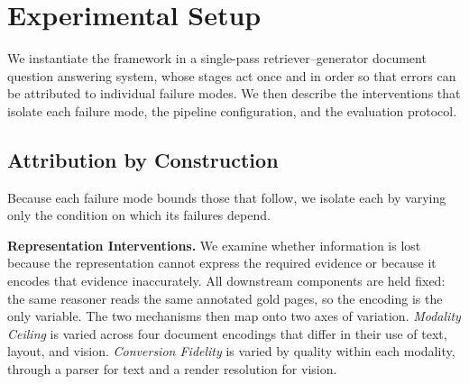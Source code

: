 \documentclass[11pt]{article}
\begin{document}

\section{Experimental Setup}
\label{sec:methodology}

We instantiate the framework in a single-pass retriever--generator document question answering system, whose stages act once and in order so that errors can be attributed to individual failure modes. We then describe the interventions that isolate each failure mode, the pipeline configuration, and the evaluation protocol.

\subsection{Attribution by Construction}
\label{subsec:attribution}

Because each failure mode bounds those that follow, 
we isolate each by varying only the condition on which its failures depend.

\textbf{Representation Interventions.} 
We examine whether information is lost because the representation cannot express the required evidence or because it encodes that evidence inaccurately. All downstream components are held fixed: the same reasoner reads the same annotated gold pages, so the encoding is the only variable. The two mechanisms then map onto two axes of variation. \emph{Modality Ceiling} is varied across four document encodings that differ in their use of text, layout, and vision. 
\emph{Conversion Fidelity} is varied by quality within each modality, through a parser for text and a render resolution for vision.
\end{document}
